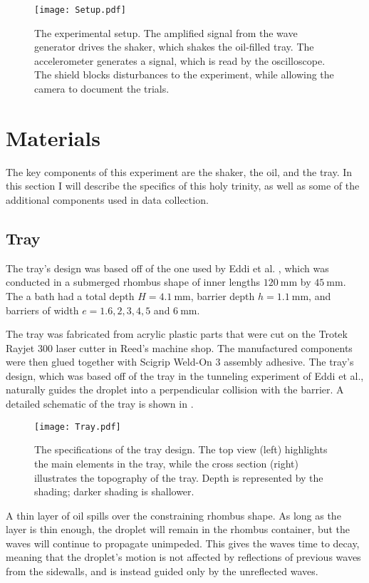    
    
\begin{figure}[h!]
	\centering
	\texttt{[image: Setup.pdf]}
	\caption{The experimental setup. The amplified signal from the wave generator drives the shaker, which shakes the oil-filled tray. The accelerometer generates a signal, which is read by the oscilloscope. The shield blocks disturbances to the experiment, while allowing the camera to document the trials.}
	\label{setup}
\end{figure}

\section{Materials}
The key components of this experiment are the shaker, the oil, and the tray. In this section I will describe the specifics of this holy trinity, as well as some of the additional components used in data collection. 

\subsection{Tray}
The tray's design was based off of the one used by Eddi et al. , which was conducted in a submerged rhombus shape of inner lengths $120~\mathrm{mm}$ by $45~\mathrm{mm}$. The a bath had a total depth $H = 4.1~\mathrm{mm}$, barrier depth $h = 1.1~\mathrm{mm}$, and barriers of width $e = 1.6, 2, 3, 4, 5 $ and $ 6~\mathrm{mm}$.

The tray was fabricated from acrylic plastic parts that were cut on the Trotek Rayjet 300 laser cutter in Reed's machine shop. The manufactured components were then glued together with Scigrip Weld-On 3 assembly adhesive. The tray's design, which was based off of the tray in the tunneling experiment of Eddi et al., naturally guides the droplet into a perpendicular collision with the barrier. A detailed schematic of the tray is shown in . 

\begin{figure}[h!]
	\centering
	\texttt{[image: Tray.pdf]}
	\caption{The specifications of the tray design. The top view (left) highlights the main elements in the tray, while the cross section (right) illustrates the topography of the tray. Depth is represented by the shading; darker shading is shallower.}
	\label{tray}
\end{figure}

A thin layer of oil spills over the constraining rhombus shape. As long as the layer is thin enough, the droplet will remain in the rhombus container, but the waves will continue to propagate unimpeded. This gives the waves time to decay, meaning that the droplet's motion is not affected by reflections of previous waves from the sidewalls, and is instead guided only by the unreflected waves. 

